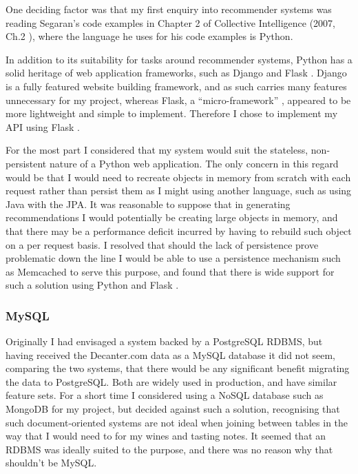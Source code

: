 One deciding factor was that my first enquiry into recommender systems was reading Segaran's code examples in Chapter 2 of Collective Intelligence (2007, Ch.2 \cite{Segaran07}), where the language he uses for his code examples is Python. 

In addition to its suitability for tasks around recommender systems, Python has a solid heritage of web application frameworks, such as Django \cite{DjangoProject} and Flask \cite{Flask}. Django is a fully featured website building framework, and as such carries many features unnecessary for my project, whereas Flask, a ``micro-framework'' \cite{Flask}, appeared to be more lightweight and simple to implement. Therefore I chose to implement my API using Flask \cite{Flask}.

For the most part I considered that my system would suit the stateless, non-persistent nature of a Python web application. The only concern in this regard would be that I would need to recreate objects in memory from scratch with each request rather than persist them as I might using another language, such as using Java with the JPA\cite{JavaJPA}. It was reasonable to suppose that in generating recommendations I would potentially be creating large objects in memory, and that there may be a performance deficit incurred by having to rebuild such object on a per request basis. I resolved that should the lack of persistence prove problematic down the line I would be able to use a persistence mechanism such as Memcached \cite{PythonMemcached} to serve this purpose, and found that there is wide support for such a solution using Python and Flask \cite{FlaskMemcached}.

\subsubsection{MySQL}

Originally I had envisaged a system backed by a PostgreSQL \cite{PostgreSQL} RDBMS, but having received the Decanter.com data as a MySQL \cite{MySQL} database it did not seem, comparing the two systems, that there would be any significant benefit migrating the data to PostgreSQL. Both are widely used in production, and have similar feature sets. For a short time I considered using a NoSQL database such as MongoDB \cite{MongoDB} for my project, but decided against such a solution, recognising that such document-oriented systems are not ideal when joining between tables in the way that I would need to for my wines and tasting notes. It seemed that an RDBMS was ideally suited to the purpose, and there was no reason why that shouldn't be MySQL.

